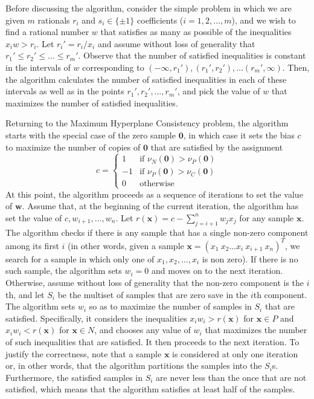 \documentclass[11pt]{article}
\theoremstyle{definition}
\newcommand{\vect}[1]{\mathbf{#1}}
\begin{document}
Before discussing the algorithm, 
consider the simple problem in which we are given $m$ rationals $r_i$ and 
$s_i \in \{ \pm 1 \}$ coefficients ($i = 1, 2, \dots, m$),
and we wish to find a rational number $w$ that satisfies as many as possible of the inequalities
$x_i w > r_i$.
Let $r_i' = r_i / x_i$ and assume without loss of generality that 
$r_1' \leq r_2' \leq \dots \leq r_m'$.
Observe that the number of satisfied inequalities is constant in the 
intervals of $w$ corresponding to
$(-\infty, r_1'), (r_1', r_2'), \dots (r_m', \infty)$.
Then, the algorithm calculates the number of satisfied inequalities in each of these intervals 
as well as in the points $r_1', r_2', \dots, r_m'$, and pick the
value of $w$ that maximizes the number of satisfied inequalities. 

Returning to the Maximum Hyperplane Consistency problem,  
the algorithm starts with the special case of the zero sample $\vect{0}$, in which 
case it sets the bias $c$ to maximize the number of copies of $\vect{0}$ that are satisfied by
the assignment 
$$c = \begin{cases} 
1 & \text{if } \nu_N(\vect{0}) > \nu_P(\vect{0})\\
-1 & \text{if } \nu_P(\vect{0}) > \nu_C(\vect{0})\\
0 & \text{otherwise}
\end{cases}$$
At this point, the algorithm proceeds as a sequence of iterations to set the value of $\vect{w}$.
Assume that, at the beginning of the current iteration,
the algorithm has set the value of $c, w_{i+1}, \dots, w_n$.
Let $r(\vect{x}) = c - \sum_{j = i + 1}^n w_j x_j$ for any sample $\vect{x}$.
The algorithm checks if there is any sample that has a single non-zero component among its first $i$
(in other words, given a sample $\vect{x} = (x_1 ~ x_2 \dots x_i ~ x_{i+1} ~ x_n)^T$,
we search for a sample in which only one of $x_1, x_2, \dots , x_i$ is non zero).
If there is no such sample, the algorithm sets $w_i = 0$ and moves on to the next iteration.
Otherwise, assume without loss of generality that the non-zero component is the $i$th,
and let $S_i$ be the multiset of samples that are zero save in the $i$th component. 
The algorithm sets $w_i$ so as to maximize the number of samples in $S_i$ that are satisfied. 
Specifically, it considers the inequalities 
$x_i w_i > r(\vect{x})$ for $\vect{x} \in P$ and 
$x_i w_i < r(\vect{x})$ for $\vect{x} \in N$, and
chooses any value of $w_i$ that maximizes the number of such inequalities that are satisfied. 
It then proceeds to the next iteration.
To justify the correctness, note that a sample $\vect{x}$ is considered at only one iteration or,
in other words, that the algorithm partitions the samples into the $S_i$s.
Furthermore, the satisfied samples in $S_i$ are never less than the once that are not satisfied,
which means that the algorithm satisfies at least half of the samples.
\end{document}
